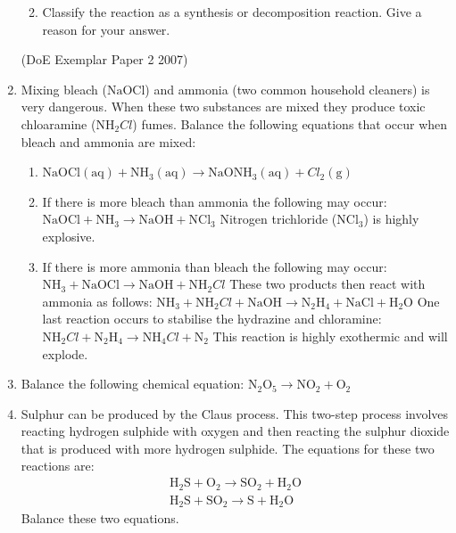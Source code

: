 \begin{enumerate}[noitemsep, label=\textbf{\arabic*}. ]
\begin{enumerate}[noitemsep, label=\textbf{\alph*}. ]
\label{m38727*uid53}\item Classify the reaction as a synthesis or decomposition reaction. Give a reason for your answer.
        \end{enumerate}
(DoE Exemplar Paper 2 2007)
\item Mixing bleach ($\mathrm{NaOCl}$) and ammonia (two common household cleaners) is very dangerous. When these two substances are mixed they produce toxic chloaramine (${\mathrm{NH}}_{2}Cl$) fumes. Balance the following equations that occur when bleach and ammonia are mixed:\label{m38727*id6432}\begin{enumerate}[noitemsep, label=\textbf{\alph*}. ] 
            \item $\mathrm{NaOCl}\left(\mathrm{aq}\right)+{\mathrm{NH}}_{3}\left(\mathrm{aq}\right)\to {\mathrm{NaONH}}_{3}\left(\mathrm{aq}\right)+{Cl}_{2}\left(\mathrm{g}\right)$\item If there is more bleach than ammonia the following may occur:
$\mathrm{NaOCl}+{\mathrm{NH}}_{3}\to \mathrm{NaOH}+{\mathrm{NCl}}_{3}$
\newline
    Nitrogen trichloride (${\mathrm{NCl}}_{3}$) is highly explosive.\item If there is more ammonia than bleach the following may occur:
${\mathrm{NH}}_{3}+\mathrm{NaOCl}\to \mathrm{NaOH}+{\mathrm{NH}}_{2}Cl$\newline
These two products then react with ammonia as follows:\newline
${\mathrm{NH}}_{3}+{\mathrm{NH}}_{2}Cl+\mathrm{NaOH}\to {\mathrm{N}}_{2}{\mathrm{H}}_{4}+\mathrm{NaCl}+{\mathrm{H}}_{2}\mathrm{O}$
\newline
    One last reaction occurs to stabilise the hydrazine and chloramine:
${\mathrm{NH}}_{2}Cl+{\mathrm{N}}_{2}{\mathrm{H}}_{4}\to {\mathrm{NH}}_{4}Cl+{\mathrm{N}}_{2}$\newline
This reaction is highly exothermic and will explode.\end{enumerate}
\item Balance the following chemical equation:
${\mathrm{N}}_{2}{\mathrm{O}}_{5}\to {\mathrm{NO}}_{2}+{\mathrm{O}}_{2}$\newline
        \item Sulphur can be produced by the Claus process. This two-step process involves reacting hydrogen sulphide with oxygen and then reacting the sulphur dioxide that is produced with more hydrogen sulphide. The equations for these two reactions are:
\label{m38727*id6243}\nopagebreak\noindent{}
    \begin{equation}
    \begin{array}{c}{\mathrm{H}}_{2}\mathrm{S}+{\mathrm{O}}_{2}\to {\mathrm{SO}}_{2}+{\mathrm{H}}_{2}\mathrm{O}\\ {\mathrm{H}}_{2}\mathrm{S}+{\mathrm{SO}}_{2}\to \mathrm{S}+{\mathrm{H}}_{2}\mathrm{O}\end{array}\tag{13.25}
      \end{equation}
Balance these two equations.\newline
\end{enumerate}

